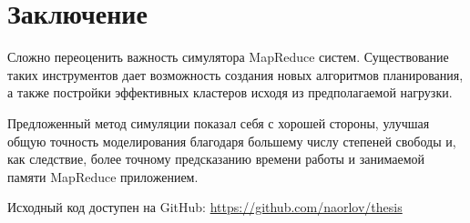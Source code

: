 \documentclass[../../thesis.tex]{subfile}
\begin{document}
    \section{Заключение}
    \label{sec:final}


    Сложно переоценить важность симулятора MapReduce систем. Существование таких
    инструментов дает возможность создания новых алгоритмов планирования, а
    также постройки эффективных кластеров исходя из предполагаемой нагрузки. 

    Предложенный метод симуляции показал себя с хорошей стороны, улучшая общую
    точность моделирования благодаря большему числу степеней свободы и, как
    следствие, более точному предсказанию времени работы и занимаемой памяти
    MapReduce приложением.

    \bigskip
    \bigskip
    \bigskip
    \bigskip
    \bigskip
    \bigskip

    Исходный код доступен на GitHub: \url{https://github.com/naorlov/thesis}
\end{document}
